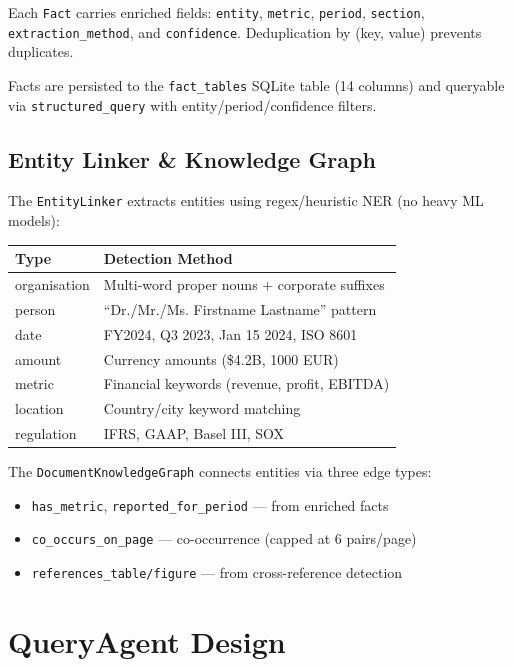 \documentclass[12pt,a4paper]{article}
\begin{document}
Each \texttt{Fact} carries enriched fields: \texttt{entity}, \texttt{metric},
\texttt{period}, \texttt{section}, \texttt{extraction\_method}, and
\texttt{confidence}.  Deduplication by (key, value) prevents duplicates.

Facts are persisted to the \texttt{fact\_tables} SQLite table (14 columns)
and queryable via \texttt{structured\_query} with entity/period/confidence
filters.

\subsection{Entity Linker \& Knowledge Graph}

The \texttt{EntityLinker} extracts entities using regex/heuristic NER
(no heavy ML models):

\begin{center}
\begin{tabular}{ll}
\toprule
\textbf{Type} & \textbf{Detection Method} \\
\midrule
organisation & Multi-word proper nouns + corporate suffixes \\
person       & ``Dr./Mr./Ms. Firstname Lastname'' pattern \\
date         & FY2024, Q3 2023, Jan 15 2024, ISO 8601 \\
amount       & Currency amounts (\$4.2B, 1000 EUR) \\
metric       & Financial keywords (revenue, profit, EBITDA) \\
location     & Country/city keyword matching \\
regulation   & IFRS, GAAP, Basel III, SOX \\
\bottomrule
\end{tabular}
\end{center}

The \texttt{DocumentKnowledgeGraph} connects entities via three edge types:
\begin{itemize}[nosep]
    \item \texttt{has\_metric}, \texttt{reported\_for\_period} — from enriched facts
    \item \texttt{co\_occurs\_on\_page} — co-occurrence (capped at 6 pairs/page)
    \item \texttt{references\_table/figure} — from cross-reference detection
\end{itemize}


\section{QueryAgent Design}
\end{document}
